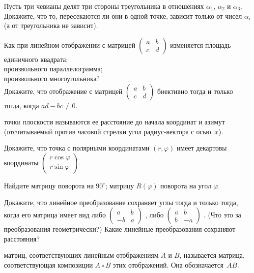 \documentclass[a4paper,12pt]{article}
\begin{document}
 Пусть три чевианы делят три стороны треугольника в отношениях $\alpha_1$, $\alpha_2$ и $\alpha_3$. Докажите, что то, пересекаются ли они в одной точке, зависит только от чисел $\alpha_i$ (а от треугольника не зависит).

 Как при линейном отображении с матрицей $\begin{pmatrix} a & b  \\ c & d \end{pmatrix}$ изменяется площадь\\
 единичного квадрата;\\  произвольного параллелограмма;\\  произвольного многоугольника?\\
 Докажите, что отображение с матрицей $\begin{pmatrix} a & b  \\ c & d \end{pmatrix}$ биективно тогда и только тогда, когда $ad-bc \neq 0$.

 точки плоскости называются ее расстояние до начала координат и азимут (отсчитываемый против часовой стрелки угол радиус-вектора с осью~$x$).

 Докажите, что точка с полярными координатами $(r, \varphi)$ имеет декартовы координаты $\begin{pmatrix} r \cos \varphi \\ r \sin \varphi \end{pmatrix}$.

 Найдите  матрицу поворота на $90^\circ$;  матрицу $R(\varphi)$ поворота на угол $\varphi$.

  Докажите, что линейное преобразование сохраняет углы тогда и только тогда, когда
его матрица имеет вид либо $\begin{pmatrix} a & b \\ -b & a \end{pmatrix}$ , либо $\begin{pmatrix} a & b \\ b & -a \end{pmatrix}$ . (Что это за преобразования
геометрически?)
 Какие линейные преобразования сохраняют расстояния?

 матриц, соответствующих линейным отображениям $A$ и $B$, называется матрица, соответствующая композиции 
$A \circ B$ этих отображений. Она обозначается~$AB$.
\end{document}

